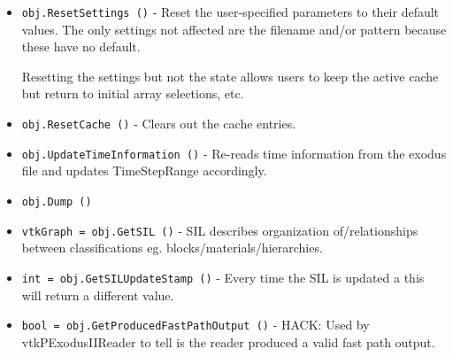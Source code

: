 \begin{itemize}
\item  \verb|obj.ResetSettings ()| -  Reset the user-specified parameters to their default values.
 The only settings not affected are the filename and/or pattern
 because these have no default.

 Resetting the settings but not the state allows users to
 keep the active cache but return to initial array selections, etc.

\item  \verb|obj.ResetCache ()| -  Clears out the cache entries.

\item  \verb|obj.UpdateTimeInformation ()| -  Re-reads time information from the exodus file and updates
 TimeStepRange accordingly.

\item  \verb|obj.Dump ()|

\item  \verb|vtkGraph = obj.GetSIL ()| -  SIL describes organization of/relationships between classifications 
 eg. blocks/materials/hierarchies.

\item  \verb|int = obj.GetSILUpdateStamp ()| -  Every time the SIL is updated a this will return a different value.

\item  \verb|bool = obj.GetProducedFastPathOutput ()| -  HACK: Used by vtkPExodusIIReader to tell is the reader produced a valid
 fast path output.

\end{itemize}
